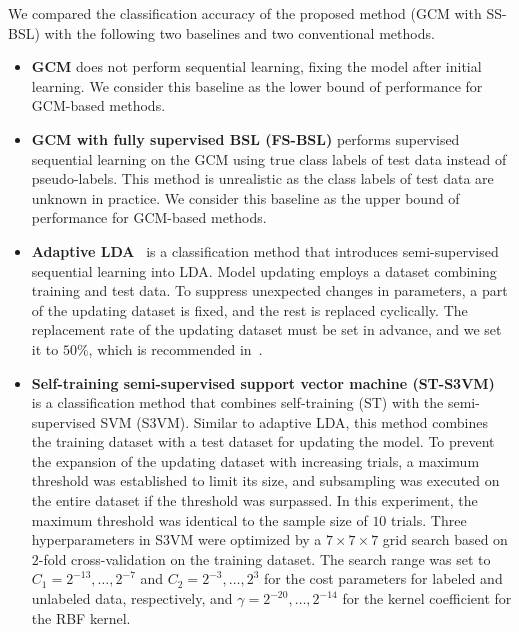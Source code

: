 \documentclass[letterpaper, 10 pt, conference]{ieeeconf}
\begin{document}
We compared the classification accuracy of the proposed method (GCM with SS-BSL) with the following two baselines and two conventional methods.

\begin{itemize}
    \item \textbf{GCM} does not perform sequential learning, fixing the model after initial learning. We consider this baseline as the lower bound of performance for GCM-based methods.
    \item \textbf{GCM with fully supervised BSL (FS-BSL)} performs supervised sequential learning on the GCM using true class labels of test data instead of pseudo-labels. This method is unrealistic as the class labels of test data are unknown in practice. We consider this baseline as the upper bound of performance for GCM-based methods.
    
    \item \textbf{Adaptive LDA}~\cite{zhang2013adaptation} is a classification method that introduces semi-supervised sequential learning into LDA. Model updating employs a dataset combining training and test data. To suppress unexpected changes in parameters, a part of the updating dataset is fixed, and the rest is replaced cyclically. The replacement rate of the updating dataset must be set in advance, and we set it to $50\%$, which is recommended in~\cite{zhang2013adaptation}.
    
    \item \textbf{Self-training semi-supervised support vector machine (ST-S3VM)}~\cite{okawa2022sequential} is a classification method that combines self-training (ST) with the semi-supervised SVM (S3VM). Similar to adaptive LDA, this method combines the training dataset with a test dataset for updating the model. To prevent the expansion of the updating dataset with increasing trials, a maximum threshold was established to limit its size, and subsampling was executed on the entire dataset if the threshold was surpassed. In this experiment, the maximum threshold was identical to the sample size of $10$ trials. Three hyperparameters in S3VM were optimized by a $7 \times 7 \times 7$ grid search based on $2$-fold cross-validation on the training dataset. The search range was set to $C_1 = 2^{-13}, \ldots, 2^{-7}$ and $C_2 = 2^{-3}, \ldots, 2^{3}$ for the cost parameters for labeled and unlabeled data, respectively, and $\gamma = 2^{-20}, \ldots, 2^{-14}$ for the kernel coefficient for the RBF kernel.
\end{itemize}
\end{document}
